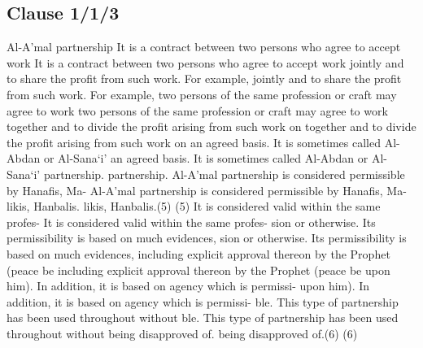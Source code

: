 \documentclass{article}%
\begin{document}
\subsection{Clause 1/1/3}%
\label{subsec:Clause1/1/3}%
Al-A’mal partnership   It is a contract between two persons who agree to accept work    It is a contract between two persons who agree to accept work  jointly and to share the profit from such work. For example,  jointly and to share the profit from such work. For example,  two persons of the same profession or craft may agree to work  two persons of the same profession or craft may agree to work  together and to divide the profit arising from such work on  together and to divide the profit arising from such work on  an agreed basis. It is sometimes called Al-Abdan or Al-Sana`i’  an agreed basis. It is sometimes called Al-Abdan or Al-Sana`i’  partnership. partnership.   Al-A’mal partnership is considered permissible by Hanafis, Ma-   Al-A’mal partnership is considered permissible by Hanafis, Ma- likis, Hanbalis. likis, Hanbalis.(5) (5) It is considered valid within the same profes-  It is considered valid within the same profes- sion or otherwise. Its permissibility is based on much evidences,  sion or otherwise. Its permissibility is based on much evidences,  including explicit approval thereon by the Prophet (peace be  including explicit approval thereon by the Prophet (peace be  upon him). In addition, it is based on agency which is permissi- upon him). In addition, it is based on agency which is permissi- ble. This type of partnership has been used throughout without  ble. This type of partnership has been used throughout without  being disapproved of. being disapproved of.(6) (6)

%
\end{document}
